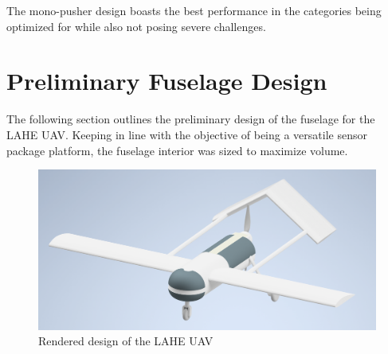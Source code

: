 \documentclass[12pt]{article}
\begin{document}
	The mono-pusher design boasts the best performance in the categories being optimized for while also not posing severe challenges.
	
	\section{Preliminary Fuselage Design}
	The following section outlines the preliminary design of the fuselage for the LAHE UAV. Keeping in line with the objective of being a versatile sensor package platform, the fuselage interior was sized to maximize volume.
	\begin{figure}[h!]
		\centering
		\includegraphics[width=6 in]{Media/Drone.png} %
		\caption{Rendered design of the LAHE UAV}
		\label{fig:fuselage}
	\end{figure}
	
\end{document}
